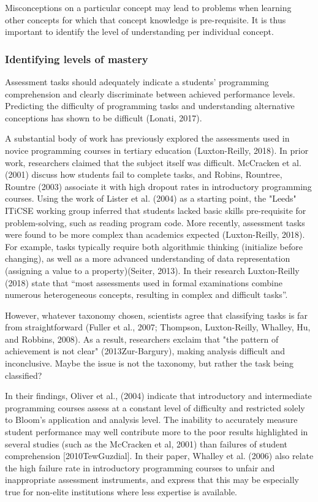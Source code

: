 Misconceptions on a particular concept may lead to problems when learning other concepts for which that concept knowledge is pre-requisite. It is thus important to identify the level of understanding per individual concept.



\subsubsection*{Identifying levels of mastery}
Assessment tasks should adequately indicate a students’ programming comprehension and clearly discriminate between achieved performance levels. Predicting the difficulty of programming tasks and understanding alternative conceptions has shown to be difficult (Lonati, 2017).


A substantial body of work has previously explored the assessments used in novice programming courses in tertiary education (Luxton-Reilly, 2018). In prior work, researchers claimed that the subject itself was difficult. McCracken et al. (2001) discuss how students fail to complete tasks, and Robins, Rountree, Rountre (2003) associate it with high dropout rates in introductory programming courses. Using the work of Lister et al. (2004) as a starting point, the "Leeds" ITiCSE working group inferred that students lacked basic skills pre-requisite for problem-solving, such as reading program code. More recently, assessment tasks were found to be more complex than academics expected (Luxton-Reilly, 2018). For example, tasks typically require both algorithmic thinking (initialize before changing), as well as a more advanced understanding of data representation (assigning a value to a property)(Seiter, 2013). In their research Luxton-Reilly (2018) state that “most assessments used in formal examinations combine numerous heterogeneous concepts, resulting in complex and difficult tasks”.

However, whatever taxonomy chosen, scientists agree that classifying tasks is far from straightforward (Fuller et al., 2007; Thompson, Luxton-Reilly, Whalley, Hu, and Robbins, 2008). As a result, researchers exclaim that "the pattern of achievement is not clear" (2013Zur-Bargury), making analysis difficult and inconclusive. Maybe the issue is not the taxonomy, but rather the task being classified?


In their findings, Oliver et al., (2004) indicate that introductory and intermediate programming courses assess at a constant level of difficulty and restricted solely to Bloom’s application and analysis level. The inability to accurately measure student performance may well contribute more to the poor results highlighted in several studies (such as the McCracken et al, 2001) than failures of student comprehension [2010TewGuzdial].  In their paper, Whalley et al. (2006) also relate the high failure rate in introductory programming courses to unfair and inappropriate assessment instruments, and express that this may be especially true for non-elite institutions where less expertise is available.


